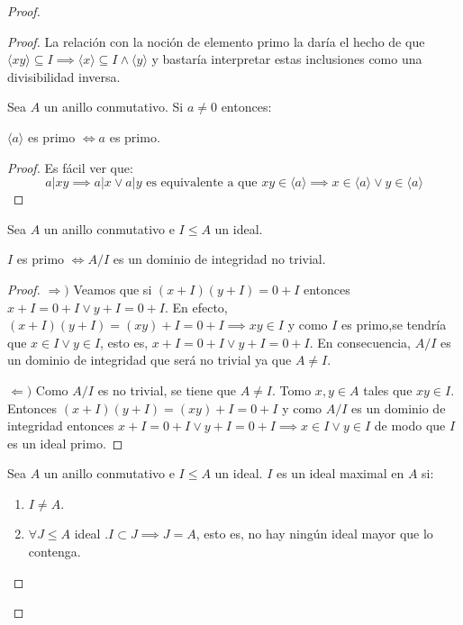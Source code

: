 \begin{proof}
\begin{proof}
La relación con la noción de elemento primo la daría el hecho de que $\langle xy \rangle \subseteq I \implies \langle x \rangle \subseteq I \land \langle y \rangle$ y bastaría interpretar estas inclusiones como una divisibilidad inversa. 

\begin{corollary}
Sea $A$ un anillo conmutativo. Si $a \neq 0$ entonces:

$\langle a \rangle$ es primo $\iff a$ es primo.
\end{corollary}
\begin{proof}
Es fácil ver que: $$a|xy \implies a|x \lor a|y \text{ es equivalente a que } xy \in \langle a \rangle \implies x \in \langle a \rangle \lor y \in \langle a \rangle$$ 
\end{proof}

\begin{proposition}
Sea $A$ un anillo conmutativo e $I \le A$ un ideal.

$I$ es primo $\iff A/I$ es un dominio de integridad no trivial. 
\end{proposition}
\begin{proof}
$\Rightarrow)$ Veamos que si $(x+I)(y+I) = 0+I$ entonces $x+ I = 0 + I \lor y + I = 0 + I$. En efecto, $(x+I)(y+I) = (xy) + I = 0+I \implies xy \in I$ y como $I$ es primo,se tendría que $x \in I \lor y \in I$, esto es, $x+ I = 0 + I \lor y + I = 0 + I$. En consecuencia, $A/I$ es un dominio de integridad que será no trivial ya que $A \neq I$. 

$\Leftarrow)$ Como $A/I$ es no trivial, se tiene que $A \neq I$. Tomo $x,y \in A$ tales que $xy \in I$. Entonces $(x+I)(y+I) = (xy)+I = 0+I$ y como $A/I$ es un dominio de integridad entonces $x+I = 0+I \lor y+I = 0+I \implies x \in I \lor y \in I$ de modo que $I$ es un ideal primo. 
\end{proof}

\begin{definition}
Sea $A$ un anillo conmutativo e $I \le A$ un ideal. $I$ es un ideal maximal en $A$ si:

\begin{enumerate}
\item $I \neq A$. 
\item $\forall J \le A$ ideal $. I \subset J \implies J = A$, esto es, no hay ningún ideal mayor que lo contenga.
\end{enumerate}
\end{definition}


\end{proof}
\end{proof}
